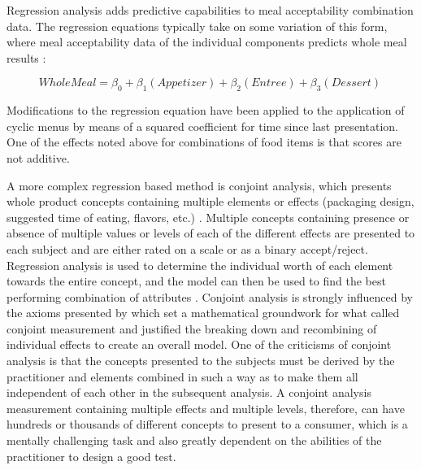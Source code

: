 Regression analysis adds predictive capabilities to meal acceptability combination data.  The regression equations typically take on some variation of this form, where meal acceptability data of the individual components predicts whole meal results \citep{Hedderley1995,Moskowitz1983,Turner1988}:

\begin{equation}
Whole Meal = \beta _{0} + \beta _1(Appetizer) + \beta _2(Entree) + \beta _3(Dessert)\
\nonumber
\end{equation}
	
Modifications to the regression equation have been applied to the application of cyclic menus by means of a squared coefficient \citep{Moskowitz1983} for time since last presentation.  One of the effects noted above for combinations of food items is that scores are not additive.  

A more complex regression based method is conjoint analysis, which presents whole product concepts containing multiple elements or effects (packaging design, suggested time of eating, flavors, etc.) \citep{Green1978}.  Multiple concepts containing presence or absence of multiple values or levels of each of the different effects are presented to each subject and are either rated on a scale or as a binary accept/reject.  Regression analysis is used to determine the individual worth of each element towards the entire concept, and the model can then be used to find the best performing combination of attributes \citep{Moskowitz2006a}.  Conjoint analysis is strongly influenced by the axioms presented by \citet{Luce1964} which set a mathematical groundwork for what \citet{Luce1964} called conjoint measurement and justified the breaking down and recombining of individual effects to create an overall model.  One of the criticisms of conjoint analysis is that the concepts presented to the subjects must be derived by the practitioner and elements combined in such a way as to make them all independent of each other in the subsequent analysis.  A conjoint analysis measurement containing multiple effects and multiple levels, therefore, can have hundreds or thousands of different concepts to present to a consumer, which is a mentally challenging task and also greatly dependent on the abilities of the practitioner to design a good test.

